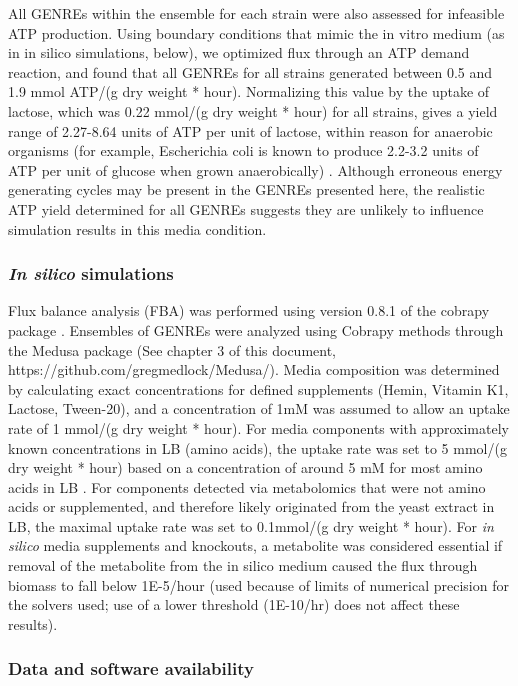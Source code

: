 \documentclass[11pt,twocolumn,notitlepage,openany,twoside]{book}
\begin{document}
\begin{refsection}
All GENREs within the ensemble for each strain were also assessed for infeasible ATP production. Using boundary conditions that mimic the in vitro medium (as in in silico simulations, below), we optimized flux through an ATP demand reaction, and found that all GENREs for all strains generated between 0.5 and 1.9 mmol ATP/(g dry weight * hour). Normalizing this value by the uptake of lactose, which was 0.22 mmol/(g dry weight * hour) for all strains, gives a yield range of 2.27-8.64 units of ATP per unit of lactose, within reason for anaerobic organisms (for example, Escherichia coli is known to produce 2.2-3.2 units of ATP per unit of glucose when grown anaerobically) \cite{Muir1985-ft}. Although erroneous energy generating cycles may be present in the GENREs presented here, the realistic ATP yield determined for all GENREs suggests they are unlikely to influence simulation results in this media condition.

\subsubsection{\textit{In silico} simulations}

Flux balance analysis (FBA) was performed using version 0.8.1 of the cobrapy package \cite{Ebrahim2013-eb}. Ensembles of GENREs were analyzed using Cobrapy methods through the Medusa package (See chapter 3 of this document, https://github.com/gregmedlock/Medusa/). Media composition was determined by calculating exact concentrations for defined supplements (Hemin, Vitamin K1, Lactose, Tween-20), and a concentration of 1mM was assumed to allow an uptake rate of 1 mmol/(g dry weight * hour). For media components with approximately known concentrations in LB (amino acids), the uptake rate was set to 5 mmol/(g dry weight * hour) based on a concentration of around 5 mM for most amino acids in LB \cite{Sezonov2007-hp}. For components detected via metabolomics that were not amino acids or supplemented, and therefore likely originated from the yeast extract in LB, the maximal uptake rate was set to 0.1mmol/(g dry weight * hour). For \textit{in silico} media supplements and knockouts, a metabolite was considered essential if removal of the metabolite from the in silico medium caused the flux through biomass to fall below 1E-5/hour (used because of limits of numerical precision for the solvers used; use of a lower threshold (1E-10/hr) does not affect these results).

\subsubsection{Data and software availability}


\end{refsection}
\end{document}
